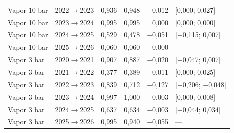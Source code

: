 {\begin{xltabular}{\linewidth}{@{}llrrrl@{}}
Vapor 10 bar & 2022$\to$2023 & 0,936 & 0,948 & 0,012 & [0,000; 0,027] \\
Vapor 10 bar & 2023$\to$2024 & 0,995 & 0,995 & 0,000 & [0,000; 0,000] \\
Vapor 10 bar & 2024$\to$2025 & 0,529 & 0,478 & $-$0,051 & [$-$0,115; 0,007] \\
Vapor 10 bar & 2025$\to$2026 & 0,060 & 0,060 & 0,000 & --- \\
Vapor 3 bar & 2020$\to$2021 & 0,907 & 0,887 & $-$0,020 & [$-$0,047; 0,007] \\
Vapor 3 bar & 2021$\to$2022 & 0,377 & 0,389 & 0,011 & [0,000; 0,025] \\
Vapor 3 bar & 2022$\to$2023 & 0,839 & 0,712 & $-$0,127 & [$-$0,206; $-$0,048] \\
Vapor 3 bar & 2023$\to$2024 & 0,997 & 1,000 & 0,003 & [0,000; 0,008] \\
Vapor 3 bar & 2024$\to$2025 & 0,637 & 0,634 & $-$0,003 & [$-$0,044; 0,034] \\
Vapor 3 bar & 2025$\to$2026 & 0,995 & 0,940 & $-$0,055 & --- \\
\end{xltabular}
}
